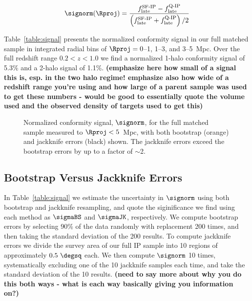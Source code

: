\begin{equation}
	\signorm(\Rproj) = \frac
	{ f^{\textrm{SF-IP}}_{\textrm{late}}-f^{\textrm{Q-IP}}_{\textrm{late}} }
	{ \left( f^{\textrm{SF-IP}}_{\textrm{late}}+f^{\textrm{Q-IP}}_{\textrm{late}} \right) /2}
\end{equation}

Table~\ref{table:signal} presents the 
normalized conformity signal in our full matched sample in integrated radial bins of 
$\Rproj=0$--1, 1--3, and 3--5~Mpc.
Over the full redshift range {$0.2<z<1.0$} we find a normalized 1-halo conformity 
signal of 5.3\% and a 2-halo signal of 1.1\%.
{\bf(emphasize here how small of a signal this is, esp. in the two halo regime! emphasize also how wide of a redshift range you're using and how large of a parent sample was used to get these numbers - would be good to essentially quote the volume used and the observed density of targets used to get this)}




\begin{figure}
  \epstrim{0.3in 0.1in 0.2in 0.3in}
  \caption{Normalized conformity signal, $\signorm$, for the full matched sample measured to {$\Rproj<5$~Mpc}, with both bootstrap (orange) and jackknife errors (black) shown.  The jackknife errors exceed the bootstrap errors by up to a factor of $\sim$2.
}
  \label{fig:normsig_full}
\end{figure}



\subsection{Bootstrap Versus Jackknife Errors}\label{sec:errors}

In Table~\ref{table:signal} we estimate the uncertainty in $\signorm$ using both 
bootstrap and jackknife resampling, and quote the siginificance we find using each 
method as $\sigmaBS$ and $\sigmaJK$, respectively.
We compute bootstrap errors by selecting 90\% of the data randomly with 
replacement 200 times, and then taking the standard deviation of the 200 results.
To compute jackknife errors we divide the survey area of our full IP sample into 10 regions of approximately $0.5~\degsq$ each.
We then compute $\signorm$ 10 times, systematically excluding one of the 10 jackknife samples each time, and take the standard deviation of the 10 results.
{\bf(need to say more about why you do this both ways - what is each way basically giving you information on?)}

